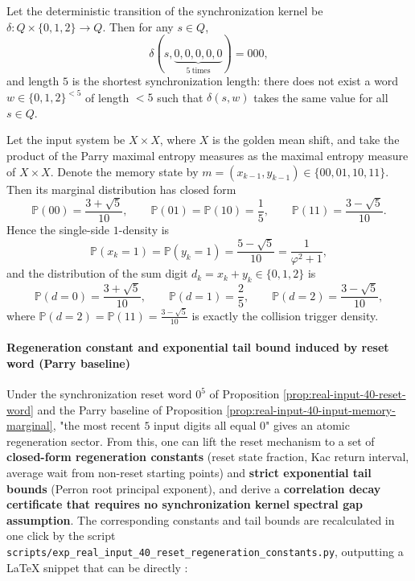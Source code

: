\begin{proposition}\label{prop:real-input-40-reset-word}
Let the deterministic transition of the synchronization kernel be $\delta:Q\times\{0,1,2\}\to Q$. Then for any $s\in Q$,
\[
\delta(s,\underbrace{0,0,0,0,0}_{5\ \text{times}})=000,
\]
and length $5$ is the shortest synchronization length: there does not exist a word $w\in\{0,1,2\}^{<5}$ of length $<5$ such that $\delta(s,w)$ takes the same value for all $s\in Q$.
\end{proposition}

\begin{proposition}\label{prop:real-input-40-input-memory-marginal}
Let the input system be $X\times X$, where $X$ is the golden mean shift, and take the product of the Parry maximal entropy measures as the maximal entropy measure of $X\times X$.
Denote the memory state by $m=(x_{k-1},y_{k-1})\in\{00,01,10,11\}$. Then its marginal distribution has closed form
\[
\mathbb{P}(00)=\frac{3+\sqrt5}{10},\qquad
\mathbb{P}(01)=\mathbb{P}(10)=\frac15,\qquad
\mathbb{P}(11)=\frac{3-\sqrt5}{10}.
\]
Hence the single-side $1$-density is
\[
\mathbb{P}(x_k=1)=\mathbb{P}(y_k=1)=\frac{5-\sqrt5}{10}=\frac{1}{\varphi^2+1},
\]
and the distribution of the sum digit $d_k=x_k+y_k\in\{0,1,2\}$ is
\[
\mathbb{P}(d=0)=\frac{3+\sqrt5}{10},\qquad
\mathbb{P}(d=1)=\frac25,\qquad
\mathbb{P}(d=2)=\frac{3-\sqrt5}{10},
\]
where $\mathbb{P}(d=2)=\mathbb{P}(11)=\frac{3-\sqrt5}{10}$ is exactly the collision trigger density.
\end{proposition}

\paragraph{Regeneration constant and exponential tail bound induced by reset word (Parry baseline)}
Under the synchronization reset word $0^5$ of Proposition \ref{prop:real-input-40-reset-word} and the Parry baseline of Proposition \ref{prop:real-input-40-input-memory-marginal}, "the most recent $5$ input digits all equal $0$" gives an atomic regeneration sector.
From this, one can lift the reset mechanism to a set of \textbf{closed-form regeneration constants} (reset state fraction, Kac return interval, average wait from non-reset starting points) and \textbf{strict exponential tail bounds} (Perron root principal exponent), and derive a \textbf{correlation decay certificate that requires no synchronization kernel spectral gap assumption}.
The corresponding constants and tail bounds are recalculated in one click by the script \texttt{scripts/exp\_real\_input\_40\_reset\_regeneration\_constants.py}, outputting a \LaTeX{} snippet that can be directly \verb||:


